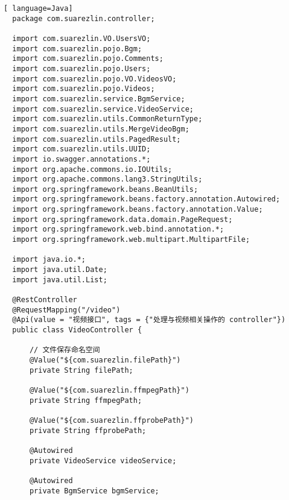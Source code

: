 \begin{lstlisting}[ language=Java]
  package com.suarezlin.controller;

  import com.suarezlin.VO.UsersVO;
  import com.suarezlin.pojo.Bgm;
  import com.suarezlin.pojo.Comments;
  import com.suarezlin.pojo.Users;
  import com.suarezlin.pojo.VO.VideosVO;
  import com.suarezlin.pojo.Videos;
  import com.suarezlin.service.BgmService;
  import com.suarezlin.service.VideoService;
  import com.suarezlin.utils.CommonReturnType;
  import com.suarezlin.utils.MergeVideoBgm;
  import com.suarezlin.utils.PagedResult;
  import com.suarezlin.utils.UUID;
  import io.swagger.annotations.*;
  import org.apache.commons.io.IOUtils;
  import org.apache.commons.lang3.StringUtils;
  import org.springframework.beans.BeanUtils;
  import org.springframework.beans.factory.annotation.Autowired;
  import org.springframework.beans.factory.annotation.Value;
  import org.springframework.data.domain.PageRequest;
  import org.springframework.web.bind.annotation.*;
  import org.springframework.web.multipart.MultipartFile;
  
  import java.io.*;
  import java.util.Date;
  import java.util.List;
  
  @RestController
  @RequestMapping("/video")
  @Api(value = "视频接口", tags = {"处理与视频相关操作的 controller"})
  public class VideoController {
  
      // 文件保存命名空间
      @Value("${com.suarezlin.filePath}")
      private String filePath;
  
      @Value("${com.suarezlin.ffmpegPath}")
      private String ffmpegPath;
  
      @Value("${com.suarezlin.ffprobePath}")
      private String ffprobePath;
  
      @Autowired
      private VideoService videoService;
  
      @Autowired
      private BgmService bgmService;
  

\end{lstlisting}
